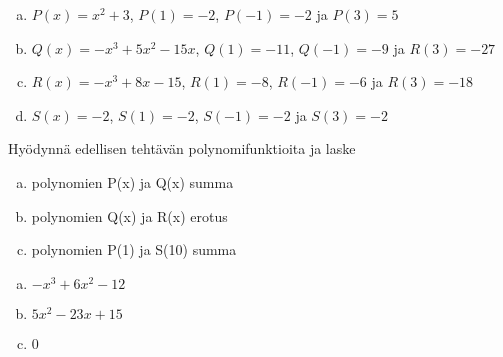\begin{tehtavasivu}
\begin{tehtava}
	\begin{vastaus}
		\begin{enumerate}[a)]
			\item $P(x)=x^2+3$, $P(1)=-2$, $P(-1)=-2$ ja $P(3)=5$
			\item $Q(x)=-x^3+5x^2-15x$, $Q(1)=-11$, $Q(-1)=-9$ ja $R(3)=-27$
			\item $R(x)=-x^3+8x-15$, $R(1)=-8$, $R(-1)=-6$ ja $R(3)=-18$
			\item $S(x)=-2$, $S(1)=-2$, $S(-1)=-2$ ja $S(3)=-2$
		\end{enumerate}
	\end{vastaus}
\end{tehtava}

\begin{tehtava}
	Hyödynnä edellisen tehtävän polynomifunktioita ja laske
	\begin{enumerate}[a)]
		 \item polynomien P(x) ja Q(x) summa
		 \item polynomien Q(x) ja R(x) erotus
		 \item polynomien P(1) ja S(10) summa
	\end{enumerate}
	
	\begin{vastaus}
		\begin{enumerate}[a)]
			\item $-x^3+6x^2-12$
			\item $5x^2-23x+15$
			\item $0$
	\end{enumerate}
	\end{vastaus}
\end{tehtava}

\end{tehtavasivu}
